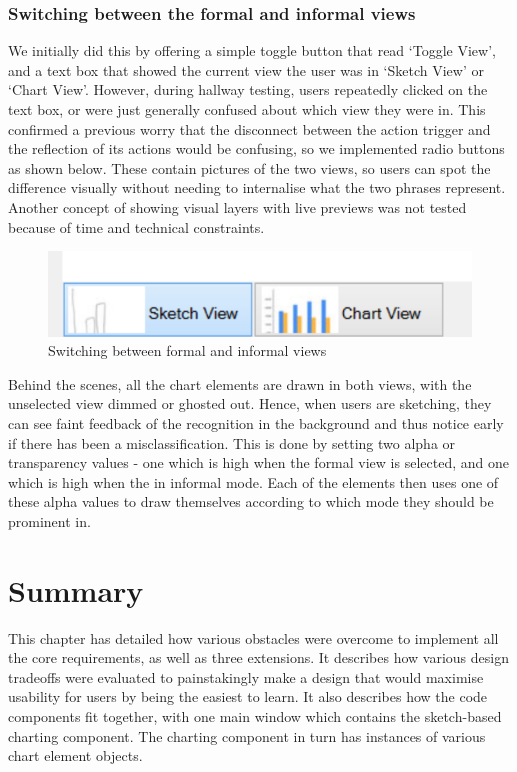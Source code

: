 	\subsubsection{Switching between the formal and informal views}
	We initially did this by offering a simple toggle button that read `Toggle View', and a text box that showed the current view the user was in `Sketch View' or `Chart View'. However, during hallway testing, users repeatedly clicked on the text box, or were just generally confused about which view they were in. This confirmed a previous worry that the disconnect between the action trigger and the reflection of its actions would be confusing, so we implemented radio buttons as shown below. These contain pictures of the two views, so users can spot the difference visually without needing to internalise what the two phrases represent. Another concept of showing visual layers with live previews was not tested because of time and technical constraints.
	
	
	\begin{figure}[h]
	\centering
	\includegraphics[scale=1]{toggle}
	\caption{Switching between formal and informal views}
	\end{figure}
	
	Behind the scenes, all the chart elements are drawn in both views, with the unselected view dimmed or ghosted out. Hence, when users are sketching, they can see faint feedback of the recognition in the background and thus notice early if there has been a misclassification. This is done by setting two alpha or transparency values - one which is high when the formal view is selected, and one which is high when the in informal mode. Each of the elements then uses one of these alpha values to draw themselves according to which mode they should be prominent in.
	
	
\section{Summary}
This chapter has detailed how various obstacles were overcome to implement all the core requirements, as well as three extensions. It describes how various design tradeoffs were evaluated to painstakingly make a design that would maximise usability for users by being the easiest to learn. It also describes how the code components fit together, with one main window which contains the sketch-based charting component. The charting component in turn has instances of various chart element objects.